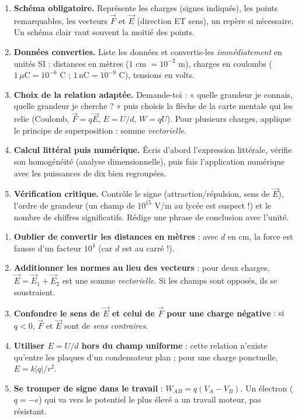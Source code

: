 \documentclass[11pt]{article}
\newcommand{\cle}[1]{{\popxbold\color{popdark}#1}}
\begin{document}
\begin{methode}
\begin{enumerate}
\item \textbf{Schéma obligatoire.} Représente les charges (signes indiqués), les points remarquables, les vecteurs $\vec{F}$ et $\vec{E}$ (direction ET sens), un repère si nécessaire. Un schéma clair vaut souvent la moitié des points.
\item \textbf{Données converties.} Liste les données et convertis-les \emph{immédiatement} en unités SI : distances en mètres ($1$ cm $= 10^{-2}$ m), charges en coulombs ($1\,\mu\text{C} = 10^{-6}$ C ; $1\,\text{nC} = 10^{-9}$ C), tensions en volts.
\item \textbf{Choix de la relation adaptée.} Demande-toi : « quelle grandeur je connais, quelle grandeur je cherche ? » puis choisis la flèche de la carte mentale qui les relie (Coulomb, $\vec{F} = q\vec{E}$, $E = U/d$, $W = qU$). Pour plusieurs charges, applique le \cle{principe de superposition} : somme \emph{vectorielle}.
\item \textbf{Calcul littéral puis numérique.} Écris d'abord l'expression littérale, vérifie son homogénéité (analyse dimensionnelle), puis fais l'application numérique avec les puissances de dix bien regroupées.
\item \textbf{Vérification critique.} Contrôle le signe (attraction/répulsion, sens de $\vec{E}$), l'ordre de grandeur (un champ de $10^{15}$ V/m au lycée est suspect !) et le nombre de chiffres significatifs. Rédige une phrase de conclusion avec l'unité.
\end{enumerate}
\end{methode}

\begin{attention}
\begin{enumerate}
\item \textbf{Oublier de convertir les distances en mètres} : avec $d$ en cm, la force est fausse d'un facteur $10^{4}$ (car $d$ est au carré !).
\item \textbf{Additionner les normes au lieu des vecteurs} : pour deux charges, $\vec{E} = \vec{E}_1 + \vec{E}_2$ est une somme \emph{vectorielle}. Si les champs sont opposés, ils se soustraient.
\item \textbf{Confondre le sens de $\vec{E}$ et celui de $\vec{F}$ pour une charge négative} : si $q < 0$, $\vec{F}$ et $\vec{E}$ sont de \emph{sens contraires}.
\item \textbf{Utiliser $E = U/d$ hors du champ uniforme} : cette relation n'existe qu'entre les plaques d'un condensateur plan ; pour une charge ponctuelle, $E = k|q|/r^2$.
\item \textbf{Se tromper de signe dans le travail} : $W_{AB} = q(V_A - V_B)$. Un électron ($q = -e$) qui va vers le potentiel le plus élevé a un travail moteur, pas résistant.
\end{enumerate}
\end{attention}
\end{document}
